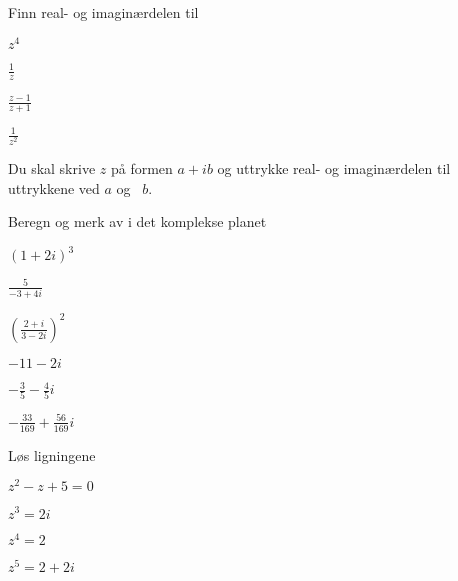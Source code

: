 

\begin{oppgave}
Finn real- og imaginærdelen til
\begin{punkt}
$z^4$ 
\end{punkt}
\begin{punkt}
$\frac{1}{z}$ 
\end{punkt}
\begin{punkt}
$\frac{z-1}{z+1}$ 
\end{punkt}
\begin{punkt}
$\frac{1}{z^2}$ 
\end{punkt}
\end{oppgave}

\begin{losning}
Du skal skrive $z$ på formen $a+ib$ og uttrykke real- og imaginærdelen til uttrykkene ved $a$ og ~$b$.
\end{losning}


\begin{oppgave}
Beregn og merk av i det komplekse planet
\begin{punkt}
$(1+2i)^3$ 
\end{punkt}
\begin{punkt}
$\frac{5}{-3+4i}$  
\end{punkt}
\begin{punkt}
$\left(\frac{2+i}{3-2i}\right)^2$
\end{punkt}
\end{oppgave}

\begin{losning}
\begin{punkt}
$-11-2i$
\end{punkt}
\begin{punkt}
$-\frac{3}{5}-\frac{4}{5}i$  
\end{punkt}
\begin{punkt}
$-\frac{33}{169}+\frac{56}{169}i$  
\end{punkt}
\end{losning}

\begin{oppgave}
Løs ligningene

\begin{punkt}
$z^2-z+5=0$ 
\end{punkt}
\begin{punkt}
$z^3=2i$
\end{punkt}
\begin{punkt}
$z^4=2 $
\end{punkt}
\begin{punkt}
$z^5=2+2i$
\end{punkt}
\end{oppgave}

